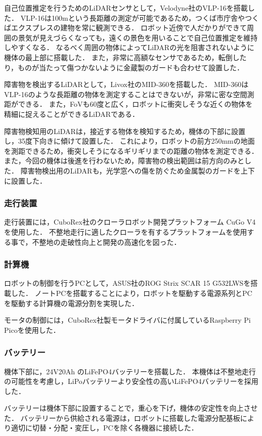 自己位置推定を行うためのLiDARセンサとして，Velodyne社のVLP-16\cite{VLP16}を搭載した．
VLP-16は100mという長距離の測定が可能であるため，つくば市庁舎やつくばエクスプレスの建物を常に観測できる．
ロボット近傍で人だかりができて周囲の景気が見えづらくなっても，遠くの景色を用いることで自己位置推定を維持しやすくなる．
なるべく周囲の物体によってLiDARの光を阻害されないように機体の最上部に搭載した．
また，非常に高額なセンサであるため，転倒したり，ものが当たって傷つかないように金蔵製のガードも合わせて設置した．

障害物を検出するLiDARとして，Livox社のMID-360\cite{MID360}を搭載した．
MID-360はVLP-16のような長距離の物体を測定することはできないが，非常に密な空間測距ができる．
また，FoVも60度と広く，ロボットに衝突しそうな近くの物体を精細に捉えることができるLiDARである．

障害物検知用のLiDARは，接近する物体を検知するため，機体の下部に設置し，35度下向きに傾けて設置した．
これにより，ロボットの前方250mmの地面を測距できるため，衝突しそうになるギリギリまでの距離の物体を測定できる．
また，今回の機体は後進を行わないため，障害物の検出範囲は前方向のみとした．
障害物検出用のLiDARも，光学窓への傷を防ぐため金属製のガードを上下に設置した．

\subsubsection{走行装置}
走行装置には，CuboRex社のクローラロボット開発プラットフォーム CuGo V4\cite{CuGo}を使用した．
不整地走行に適したクローラを有するプラットフォームを使用する事で，不整地の走破性向上と開発の高速化を図った．

\subsubsection{計算機}
ロボットの制御を行うPCとして，ASUS社のROG Strix SCAR 15 G532LWS\cite{PC}を搭載した．
ノートPCを搭載することにより，ロボットを駆動する電源系列とPCを駆動する計算機の電源分割を実現した．

モータの制御には，CuboRex社製モータドライバに付属しているRaspberry Pi Pico\cite{PICO}を使用した．

\subsubsection{バッテリー}
機体下部に，24V20Ah のLiFePO4バッテリーを搭載した．
本機体は不整地走行の可能性を考慮し，LiPoバッテリーより安全性の高いLiFePO4バッテリーを採用した．

バッテリーは機体下部に設置することで，重心を下げ，機体の安定性を向上させた．
バッテリーから供給される電源は，ロボットに搭載した電源分配基板により適切に切替・分配・変圧し，PCを除く各機器に接続した．

